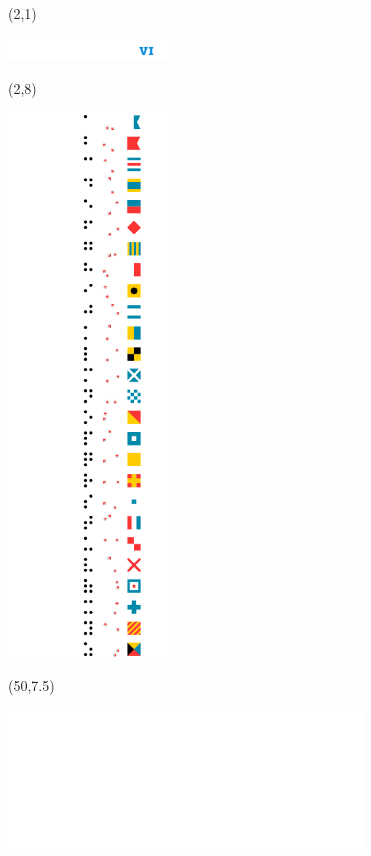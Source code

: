 \documentclass{extarticle}
\begin{document}
\pagecolor{black}
\pagestyle{empty}

\begin{textblock}{88}(2,1)
\vfill
{\centerline{\includegraphics[height=6mm]{tools/images/logo-navic-6.pdf}}} 
\vfill
\end{textblock}

\begin{textblock}{42}(2,8)
\vfill
{\centerline{\includegraphics[width=42.5mm]{tools/main.pdf}}} 
\vfill
\end{textblock}


\begin{textblock}{38}(50,7.5)
\vfill
{\centerline{\includegraphics[scale=0.7]{tools/rosicrucian-polish.pdf}}} 
\vfill
\end{textblock}
\end{document}
